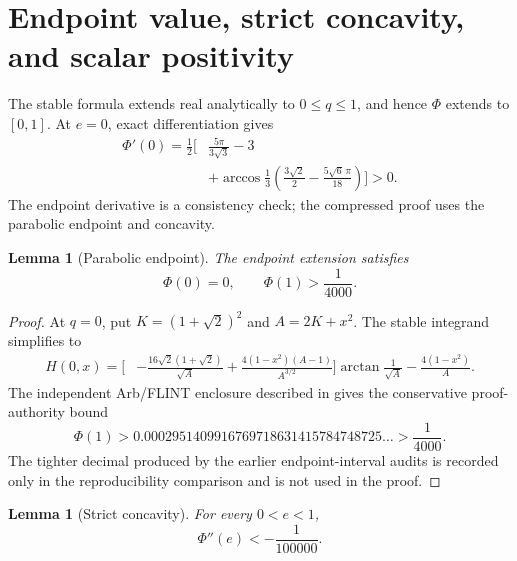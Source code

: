 \documentclass[11pt]{article}
\numberwithin{equation}{section}
\newtheorem{lemma}[theorem]{Lemma}
\theoremstyle{remark}
\begin{document}
\section{Endpoint value, strict concavity, and scalar positivity}
\label{sec:certificate}

The stable formula extends real analytically to \(0\le q\le1\), and hence \(\Phi\) extends to \([0,1]\).  At \(e=0\), exact differentiation gives
\begin{equation}
\begin{aligned}
  \Phi'(0)=\frac12\bigg[&\frac{5\pi}{3\sqrt3}-3\\
  &+\arccos\frac13
  \left(\frac{3\sqrt2}{2}-\frac{5\sqrt6\,\pi}{18}\right)
  \bigg]>0.
\end{aligned}
\label{eq:phi-prime-zero}
\end{equation}
The endpoint derivative is a consistency check; the compressed proof uses the parabolic endpoint and concavity.

\begin{lemma}[Parabolic endpoint]
\label{lem:parabolic-endpoint}
The endpoint extension satisfies
\begin{equation}
  \Phi(0)=0,
  \qquad
  \Phi(1)>\frac1{4000}.
  \label{eq:endpoint-bound}
\end{equation}
\end{lemma}

\begin{proof}
At \(q=0\), put \(K=(1+\sqrt2)^2\) and \(A=2K+x^2\).  The stable integrand simplifies to
\begin{equation}
\begin{aligned}
H(0,x)=\bigg[&-\frac{16\sqrt2(1+\sqrt2)}{\sqrt A}
 +\frac{4(1-x^2)(A-1)}{A^{3/2}}\bigg]
 \arctan\frac1{\sqrt A}
 -\frac{4(1-x^2)}A.
\end{aligned}
\label{eq:endpoint-integrand}
\end{equation}
The independent Arb/FLINT enclosure described in  gives the conservative proof-authority bound
\[
  \Phi(1)>
  0.0002951409916769718631415784748725\ldots
  >\frac1{4000}.
\]
The tighter decimal produced by the earlier endpoint-interval audits is recorded only in the reproducibility comparison and is not used in the proof.
\end{proof}

\begin{lemma}[Strict concavity]
\label{lem:concavity}
For every \(0<e<1\),
\begin{equation}
  \Phi''(e)<-\frac1{100000}.
  \label{eq:concavity-bound}
\end{equation}
\end{lemma}
\end{document}
